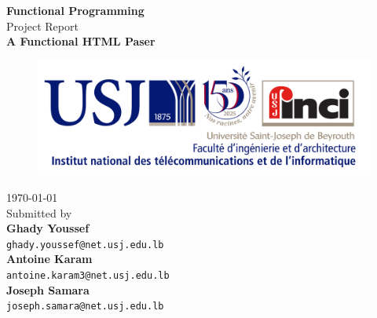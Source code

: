 \begin{titlepage}

    \vspace*{\fill}
    \begin{center}
        \textup{\large\textbf{Functional Programming}\\
            \small{Project Report}}\\[0.3in]

        \Large \textbf {A Functional HTML Paser}\\[0.3in]

        \begin{figure}[h]
            \centering
            \includegraphics[width=0.65\linewidth]{assets/inci.png}
        \end{figure}

        \vspace{.5in}

        \normalsize\today\\
        Submitted by \\[0.2in]

        \textbf{Ghady Youssef}\\
        \texttt{ghady.youssef@net.usj.edu.lb}\\
        \vspace{.3in}
        \textbf{Antoine Karam}\\
        \texttt{antoine.karam3@net.usj.edu.lb}\\
        \vspace{.3in}
        \textbf{Joseph Samara}\\
        \texttt{joseph.samara@net.usj.edu.lb}\\
    \end{center}
    \vspace*{\fill}

\end{titlepage}
